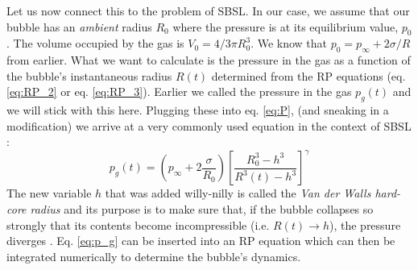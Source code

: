 \documentclass[rmp,aps,nofootinbib,superscriptaddress,floatfix]{revtex4-2}
\begin{document}
Let us now connect this to the problem of SBSL. In our case, we assume that our bubble has an \emph{ambient} radius $R_0$ where the pressure is at its equilibrium value, $p_0$. The volume occupied by the gas is $V_0 =  4/3 \pi R_0^3$. We know that $p_0=p_\infty+2\sigma /R$ from earlier. What we want to calculate is the pressure in the gas as a function of the bubble's instantaneous radius $R(t)$ determined from the RP equations (eq. \ref{eq:RP_2} or eq. \ref{eq:RP_3}). Earlier we called the pressure in the gas $p_g(t)$ and we will stick with this here. Plugging these into eq. \ref{eq:P}, (and sneaking in a modification) we arrive at a very commonly used equation in the context of SBSL \cite{brenner2002single,lofstedt1995sonoluminescing,barber1997defining,lofstedt1993toward,hilgenfeldt1999simple}:
\begin{equation}
    p_g(t) = \left( p_\infty+2\frac{\sigma}{R_0} \right) \left[ \frac{R_0^3-h^3}{R^3(t)-h^3} \right] ^ \gamma
    \label{eq:p_g}
\end{equation}
The new variable $h$ that was added willy-nilly is called the \emph{Van der Walls hard-core radius} and its purpose is to make sure that, if the bubble collapses so strongly that its contents become incompressible (i.e. $R(t)\rightarrow h$), the pressure diverges \cite{lofstedt1993toward,brenner2002single}. Eq. \ref{eq:p_g} can be inserted into an RP equation which can then be integrated numerically to determine the bubble's dynamics. 
\end{document}
